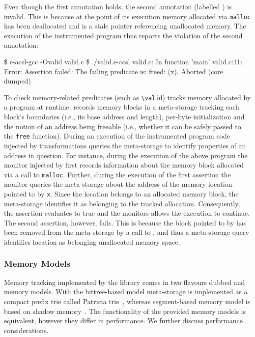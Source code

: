 
Even though the first annotation holds, the second annotation (labelled
) is invalid. This is because at the point of its execution memory
allocated via \texttt{malloc} has been deallocated and  is a stale pointer
referencing unallocated memory.  The execution of the instrumented program thus
reports the violation of the second annotation:

\begin{logs}
\$ e-acsl-gcc -Ovalid valid.c
\$ ./valid.e-acsl
valid.c: In function 'main'
valid.c:11: Error: Assertion failed:
        The failing predicate is:
        freed: \valid(x).
Aborted (core dumped)
\end{logs}

To check memory-related predicates (such as \lstinline|\valid|) \eacsl tracks
memory allocated by a program at runtime. \eacsl records memory blocks in a
meta-storage tracking each block's boundaries (i.e., its base address and
length), per-byte initialization and the notion of an address being freeable
(i.e., whether it can be safely passed to the \texttt{free} function).  During
an execution of the instrumented program code injected by \eacsl
transformations queries the meta-storage to identify properties of an address
in question.  For instance, during the execution of the above program the
monitor injected by \eacsl first records information about the memory block
allocated via a call to \texttt{malloc}.  Further, during the execution of the
first assertion the monitor queries the meta-storage about the address of the
memory location pointed to by \texttt{x}.  Since the location belongs to an
allocated memory block, the meta-storage identifies it as belonging to the
tracked allocation.  Consequently, the assertion evaluates to true and the
monitors allows the execution to continue.  The second assertion, however,
fails. This is because the block pointed to by  has been removed from the
meta-storage by a call to , and thus a meta-storage query identifies
location  as belonging unallocated memory space.

\subsubsection{\eacsl Memory Models}

Memory tracking implemented by the \eacsl library comes in two flavours dubbed
 and  memory models. With the bittree-based
model meta-storage is implemented as a compact prefix trie called Patricia
trie~\cite{rv13}, whereas segment-based memory model is based on shadow
memory~\cite{vorobyov17ismm}. The functionality of the provided memory models is
equivalent, however they differ in performance. We further discuss performance
considerations.

